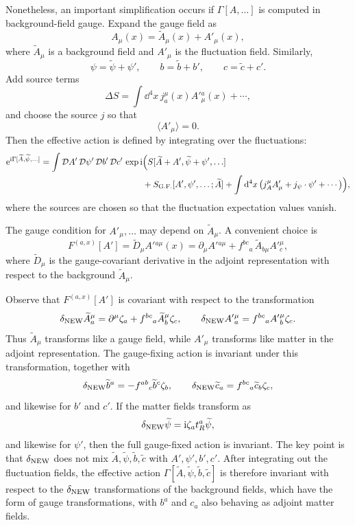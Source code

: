 Nonetheless, an important simplification occurs if
\(\Gamma[A,\ldots]\) is computed in background-field gauge.  Expand the
gauge field as
\[
  A_\mu(x)=\widetilde A_\mu(x)+A'_\mu(x),
\]
where \(\widetilde A_\mu\) is a background field and \(A'_\mu\) is the
fluctuation field.  Similarly,
\[
  \psi=\widetilde\psi+\psi',
  \qquad
  b=\widetilde b+b',
  \qquad
  c=\widetilde c+c'.
\]
Add source terms
\[
  \Delta S
  =
  \int\dd^4x\,
  j^\mu_a(x)A'{}^a_\mu(x)+\cdots,
\]
and choose the source \(j\) so that
\[
  \langle A'_\mu\rangle=0.
\]
Then the effective action is defined by integrating over the fluctuations:
\[
\begin{aligned}
  \ee^{\ii\Gamma[\widetilde A,\widetilde\psi,\ldots]}
  &=
  \int\mathcal D A'\,\mathcal D\psi'\,\mathcal Db'\,\mathcal Dc'\,
  \exp\ii\Bigl(
    S[\widetilde A+A',\widetilde\psi+\psi',\ldots]
\\
  &\hspace{4.2cm}
    +S_{\rm G.F.}[A',\psi',\ldots;\widetilde A]
    +\int\dd^4x\,
      \bigl(j_A^\mu A'_\mu+j_\psi\cdot\psi'+\cdots\bigr)
  \Bigr),
\end{aligned}
\]
where the sources are chosen so that the fluctuation expectation values
vanish.

The gauge condition for \(A'_\mu,\ldots\) may depend on
\(\widetilde A_\mu\).  A convenient choice is
\[
  F^{(a,x)}[A']
  =
  \widetilde D_\mu A'{}^{a\mu}(x)
  =
  \partial_\mu A'{}^{a\mu}
  + f^{bc}{}_{a}\,\widetilde A_{b\mu}A'{}^\mu_c,
\]
where \(\widetilde D_\mu\) is the gauge-covariant derivative in the
adjoint representation with respect to the background
\(\widetilde A_\mu\).

Observe that \(F^{(a,x)}[A']\) is covariant with respect to the
transformation
\[
  \delta_{\rm NEW}\widetilde A^\mu_a
  =
  \partial^\mu\zeta_a
  +f^{bc}{}_{a}\widetilde A^\mu_b\zeta_c,
  \qquad
  \delta_{\rm NEW}A'{}^\mu_a
  =
  f^{bc}{}_{a}A'{}^\mu_b\zeta_c.
\]
Thus \(\widetilde A_\mu\) transforms like a gauge field, while
\(A'_\mu\) transforms like matter in the adjoint representation.  The
gauge-fixing action is invariant under this transformation, together with
\[
  \delta_{\rm NEW}\widetilde b^a
  =
  -f^{ab}{}_{c}\widetilde b^c\zeta_b,
  \qquad
  \delta_{\rm NEW}\widetilde c_a
  =
  f^{bc}{}_{a}\widetilde c_b\zeta_c,
\]
and likewise for \(b'\) and \(c'\).  If the matter fields transform as
\[
  \delta_{\rm NEW}\widetilde\psi
  =
  \mathrm{i}\zeta_a t_R^a\widetilde\psi,
\]
and likewise for \(\psi'\), then the full gauge-fixed action is invariant.
The key point is that \(\delta_{\rm NEW}\) does not mix
\(\widetilde A,\widetilde\psi,\widetilde b,\widetilde c\) with
\(A',\psi',b',c'\).  After integrating out the fluctuation fields, the
effective action
\(\Gamma[\widetilde A,\widetilde\psi,\widetilde b,\widetilde c]\) is
therefore invariant with respect to the \(\delta_{\rm NEW}\)
transformations of the background fields, which have the form of gauge
transformations, with \(b^a\) and \(c_a\) also behaving as adjoint matter
fields.

